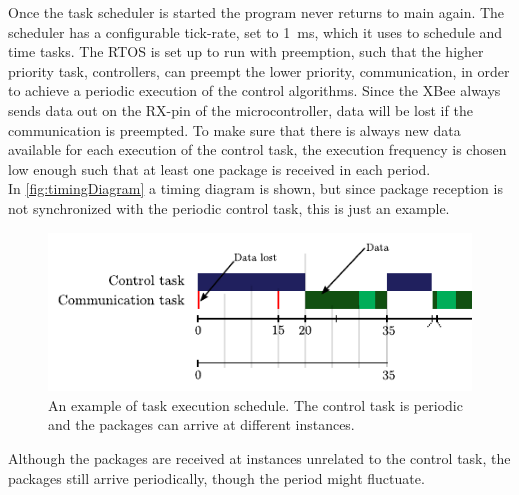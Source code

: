 Once the task scheduler is started the program never returns to main again. The scheduler has a configurable tick-rate, set to \SI{1}{ms}, which it uses to schedule and time tasks. The RTOS is set up to run with preemption, such that the higher priority task, controllers, can preempt the lower priority, communication, in order to achieve a periodic execution of the control algorithms. Since the XBee always sends data out on the RX-pin of the microcontroller, data will be lost if the communication is preempted. To make sure that there is always new data available for each execution of the control task, the execution frequency is chosen low enough such that at least one package is received in each period.\\
In \autoref{fig:timingDiagram} a timing diagram is shown, but since package reception is not synchronized with the periodic control task, this is just an example.

\begin{figure}[H]
    \includegraphics[width =.7\textwidth]{figures/timingDiagram}
    \centering			
    \caption{An example of task execution schedule. The control task is periodic and the packages can arrive at different instances.} 
    \label{fig:timingDiagram}
\end{figure}

Although the packages are received at instances unrelated to the control task, the packages still arrive periodically, though the period might fluctuate.